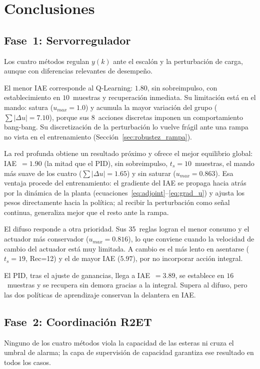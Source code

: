 \chapter{Conclusiones}
\label{ch:conclusiones}

\section*{Fase~1: Servorregulador}

Los cuatro métodos regulan $y(k)$ ante el escalón y la perturbación de carga, aunque con diferencias relevantes de desempeño.

El menor IAE corresponde al Q-Learning: $1.80$, sin sobreimpulso, con establecimiento en $10$~muestras y recuperación inmediata. Su limitación está en el mando: satura ($u_{max}=1.0$) y acumula la mayor variación del grupo ($\sum|\Delta u|=7.10$), porque sus 8~acciones discretas imponen un comportamiento bang-bang. Su discretización de la perturbación lo vuelve frágil ante una rampa no vista en el entrenamiento (Sección~\ref{sec:robustez_rampa}).

La red profunda obtiene un resultado próximo y ofrece el mejor equilibrio global: IAE~$=1.90$ (la mitad que el PID), sin sobreimpulso, $t_s=10$~muestras, el mando más suave de los cuatro ($\sum|\Delta u|=1.65$) y sin saturar ($u_{max}=0.863$). Esa ventaja procede del entrenamiento: el gradiente del IAE se propaga hacia atrás por la dinámica de la planta (ecuaciones~\ref{eq:adjoint}--\ref{eq:grad_u}) y ajusta los pesos directamente hacia la política; al recibir la perturbación como señal continua, generaliza mejor que el resto ante la rampa.

El difuso responde a otra prioridad. Sus 35~reglas logran el menor consumo y el actuador más conservador ($u_{max}=0.816$), lo que conviene cuando la velocidad de cambio del actuador está muy limitada. A cambio es el más lento en asentarse ($t_s=19$, Rec=12) y el de mayor IAE ($5.97$), por no incorporar acción integral.

El PID, tras el ajuste de ganancias, llega a IAE~$=3.89$, se establece en $16$~muestras y se recupera sin demora gracias a la integral. Supera al difuso, pero las dos políticas de aprendizaje conservan la delantera en IAE.

\section*{Fase~2: Coordinación R2ET}

Ninguno de los cuatro métodos viola la capacidad de las esteras ni cruza el umbral de alarma; la capa de supervisión de capacidad garantiza ese resultado en todos los casos.

